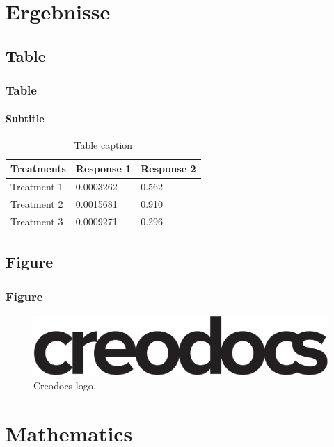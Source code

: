 \documentclass[
	11pt, %
	aspectratio=169, %
]{beamer}
\begin{document}

\section{Ergebnisse}

\subsection{Table}

\begin{frame}
	\frametitle{Table}
	\framesubtitle{Subtitle} %
	
	\begin{table}
		\begin{tabular}{l l l}
			\toprule
			\textbf{Treatments} & \textbf{Response 1} & \textbf{Response 2}\\
			\midrule
			Treatment 1 & 0.0003262 & 0.562 \\
			Treatment 2 & 0.0015681 & 0.910 \\
			Treatment 3 & 0.0009271 & 0.296 \\
			\bottomrule
		\end{tabular}
		\caption{Table caption}
	\end{table}
\end{frame}


\subsection{Figure}

\begin{frame}
	\frametitle{Figure}
	
	\begin{figure}
		\includegraphics[width=0.8\linewidth]{creodocs_logo.pdf}
		\caption{Creodocs logo.}
	\end{figure}
\end{frame}


\section{Mathematics}
\end{document}
